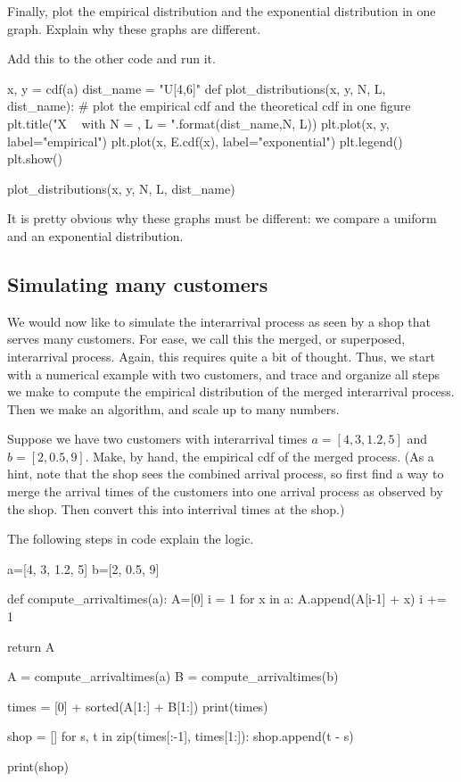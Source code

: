 \documentclass{scrartcl}
\begin{document}
\begin{exercise}
  Finally, plot the empirical distribution and the exponential distribution in one graph. Explain why these graphs are different.
\begin{solution}
Add this to the other code and run it. 
\begin{pyverbatim}
x, y = cdf(a)
dist_name = "U[4,6]"
def plot_distributions(x, y, N, L, dist_name):
    # plot the empirical cdf and the theoretical cdf in one figure
    plt.title("X ~ {} with N = {}, L = {}".format(dist_name,N, L))
    plt.plot(x, y, label="empirical")
    plt.plot(x, E.cdf(x), label="exponential")
    plt.legend()
    plt.show()

plot_distributions(x, y, N, L, dist_name)	
\end{pyverbatim}

It is pretty obvious why these graphs must be different: we compare a uniform and an exponential distribution. 
\end{solution}
\end{exercise}


\subsection{Simulating many customers}
\label{sec:simul-many-cust}

We would now like to simulate the interarrival process as seen by a shop that serves many customers. For ease, we call this the merged, or superposed, interarrival process. Again, this requires quite a bit of thought. Thus, we start with a numerical example with two customers, and trace and organize all steps we make to compute the empirical distribution of the merged interarrival process. Then we make an algorithm, and scale up to many numbers. 

\begin{exercise}
  Suppose we have two customers with interarrival times $a=[4, 3, 1.2, 5]$ and $b=[2, 0.5, 9]$. Make, by hand, the empirical cdf of the merged process.
(As a hint, note that the shop sees the combined arrival process, so first find a way to merge the arrival times of the customers into one arrival process as observed by the shop. Then convert this into interrival times at the shop.)
  \begin{solution}
    The following steps in code explain the logic.
    \begin{pyblock}
a=[4, 3, 1.2, 5]
b=[2, 0.5, 9]

def compute_arrivaltimes(a):
    A=[0]
    i = 1
    for x in a:
        A.append(A[i-1] + x)
        i += 1

    return A

A = compute_arrivaltimes(a)
B = compute_arrivaltimes(b)


times = [0] + sorted(A[1:] + B[1:]) 
print(times)

shop = []
for s, t in zip(times[:-1], times[1:]):
    shop.append(t - s)

print(shop)
    \end{pyblock}
  \end{solution}
\end{exercise}
\end{document}
